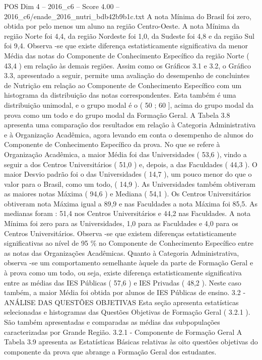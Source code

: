 \begin{textsample}{POS Dim 4 – 2016\_c6 – Score 4.00 – 2016\_c6/enade\_2016\_nutri\_bdb42b9b1c.txt}
A nota Mínima do Brasil foi zero, obtida por pelo menos um aluno na região Centro-Oeste.
A nota Mínima da região Norte foi 4,4, da região Nordeste foi 1,0, da Sudeste foi 4,8 e da região Sul foi 9,4.
Observa -se que existe diferença estatisticamente significativa da menor Média das notas do Componente de Conhecimento Específico da região Norte ( 43,4 ) em relação às demais regiões.
Assim como os Gráficos 3.1 e 3.2, o Gráfico 3.3, apresentado a seguir, permite uma avaliação do desempenho de concluintes de Nutrição em relação ao Componente de Conhecimento Específico com um histograma da distribuição das notas correspondentes.
Esta também é uma distribuição unimodal, e o grupo modal é o ( 50 ; 60 ], acima do grupo modal da prova como um todo e do grupo modal da Formação Geral.
A Tabela 3.8 apresenta uma comparação dos resultados em relação à Categoria Administrativa e à Organização Acadêmica, agora levando em conta o desempenho de alunos do Componente de Conhecimento Específico da prova.
No que se refere à Organização Acadêmica, a maior Média foi das Universidades ( 53,6 ), vindo a seguir a dos Centros Universitários ( 51,0 ) e, depois, a das Faculdades ( 44,3 ).
O maior Desvio padrão foi o das Universidades ( 14,7 ), um pouco menor do que o valor para o Brasil, como um todo, ( 14,9 ).
As Universidades também obtiveram as maiores notas Máxima ( 94,6 ) e Mediana ( 54,1 ).
Os Centros Universitários obtiveram nota Máxima igual a 89,9 e nas Faculdades a nota Máxima foi 85,5.
As medianas foram : 51,4 nos Centros Universitários e 44,2 nas Faculdades.
A nota Mínima foi zero para as Universidades, 1,0 para as Faculdades e 4,0 para os Centros Universitários.
Observa -se que existem diferenças estatisticamente significativas ao nível de 95 \% no Componente de Conhecimento Específico entre as notas das Organizações Acadêmicas.
Quanto à Categoria Administrativa, observa -se um comportamento semelhante àquele da parte de Formação Geral e à prova como um todo, ou seja, existe diferença estatisticamente significativa entre as médias das IES Públicas ( 57,6 ) e IES Privadas ( 48,2 ).
Neste caso também, a maior Média foi obtida por alunos de IES Públicas de ensino. 3.2 - ANÁLISE DAS QUESTÕES OBJETIVAS Esta seção apresenta estatísticas selecionadas e histogramas das Questões Objetivas de Formação Geral ( 3.2.1 ).
São também apresentadas e comparadas as médias das subpopulações caracterizadas por Grande Região. 3.2.1 - Componente de Formação Geral A Tabela 3.9 apresenta as Estatísticas Básicas relativas às oito questões objetivas do componente da prova que abrange a Formação Geral dos estudantes.

\end{textsample}
